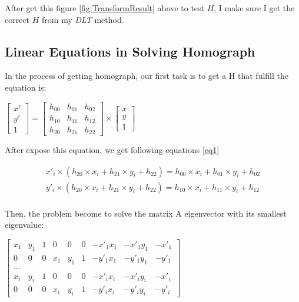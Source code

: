 \documentclass[12pt]{article}
\begin{document}
After get this figure \ref{fig:TransformResult} above to test $H$, I make sure I get the correct $H$ from my \textit{DLT} method.

\subsection{Linear Equations in Solving Homograph}

In the process of getting homograph, our first task is to get a H that fulfill the equation is:

$\begin{bmatrix} x' \\ y' \\ 1 \end{bmatrix} = \left[ \begin{array}{ccc} h_{00} & h_{01} & h_{02} \\ h_{10} & h_{11} & h_{12} \\ h_{20} & h_{21} & h_{22} \end{array} \right] \times \left[ \begin{array}{c} x \\ y \\ 1 \end{array} \right]$

After expose this equation, we get following equations \ref{eq1}

\begin{equation}
  \begin{aligned}
 		x'_{i}\times(h_{20}\times x_{i} + h_{21}\times y_{i} + h_{22}) = h_{00}\times x_{i} + h_{01}\times y_{i} + h_{02}\\
 		y'_{i}\times(h_{20}\times x_{i} + h_{21}\times y_{i} + h_{22}) = h_{10}\times x_{i} + h_{11}\times y_{i} + h_{12}\\
  \end{aligned}
  \label{eq1}
\end{equation}

Then, the problem become to solve the matrix A eigenvector with its smallest eigenvalue:

$\begin{bmatrix} x_{1} & y_{1} & 1 & 0 & 0 & 0 & -x'_{1}x_{1} & -x'_{1} y_{1} & -x'_{1} \\ 0 & 0 & 0 & x_{1} & y_{1} & 1 &  -y'_{1} x_{1} & -y'_{1} y_{1} & -y'_{1} \\ ...  \\ x_{i} & y_{i} & 1 & 0 & 0 & 0 & -x'_{i}x_{i} & -x'_{i} y_{i} & -x'_{i} \\ 0 & 0 & 0 & x_{i} & y_{i} & 1 &  -y'_{i} x_{i} & -y'_{i} y_{i} & -y'_{i} \end{bmatrix} $
\end{document}
